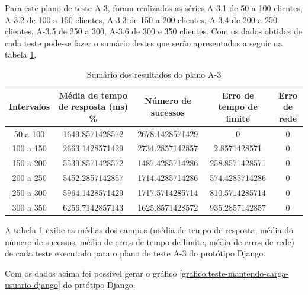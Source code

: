   Para este plano de teste A-3, foram realizados as séries A-3.1 de 50 a 100 clientes, A-3.2 de 100 a 150 clientes, A-3.3 de 150 a 200 clientes,
  A-3.4 de 200 a 250 clientes, A-3.5 de 250 a 300, A-3.6 de 300 e 350 clientes. Com os dados obtidos de cada teste pode-se fazer o sumário
  destes que serão apresentados a seguir na tabela \ref{tab:sumario-resultado-plano-teste-a-3}.
  
  \begin{table}[H]
    \centering
    \footnotesize
    \setlength{\abovecaptionskip}{0pt}
    \setlength{\belowcaptionskip}{0pt}
    \caption[Sumário dos resultados do plano A-3]{Sumário dos resultados do plano A-3}
    \label{tab:sumario-resultado-plano-teste-a-3}
    \begin{tabular}{c|c|c|c|c}
      \hline \hline
      Intervalos  & 	Média de tempo de resposta (ms) \% &	Número de sucessos & 	Erro de tempo de limite &	Erro de rede \\ 
      \hline \hline
      50 a 100 &		1649.8571428572 &		2678.1428571429 & 	0 &				0 \\
      100 a 150&		2663.1428571429 &		2734.2857142857 & 	2.8571428571  &			0 \\
      150 a 200&		5539.8571428572 &		1487.4285714286 & 	258.8571428571 &		0 \\
      200 a 250&		5452.2857142857 &		1714.4285714286 & 	574.4285714286 &		0 \\
      250 a 300&		5964.1428571429 &		1717.5714285714 & 	810.5714285714 &		0 \\
      300 a 350&		6256.7142857143 &		1625.8571428572 & 	935.2857142857 &		0 \\
      \hline \hline
    \end{tabular}
  \end{table}
   
  A tabela \ref{tab:sumario-resultado-plano-teste-a-3} exibe as médias dos campos (média de tempo de resposta, 
  média do número de sucessos, média de erros de tempo de limite, média de erros de rede) de cada teste executado 
  para o plano de teste A-3 do protótipo Django.
  
  Com os dados acima foi possível gerar o gráfico \ref{grafico:teste-mantendo-carga-usuario-django} do 
  prtótipo Django.
  
